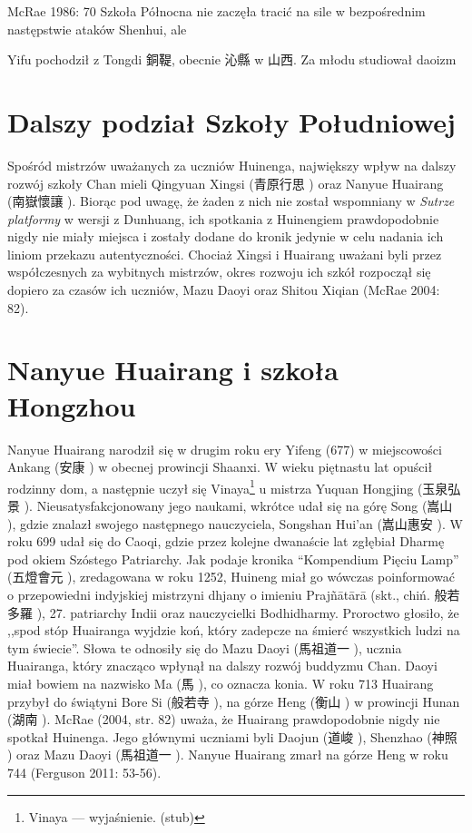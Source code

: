 McRae 1986: 70
Szkoła Północna nie zaczęła tracić na sile w bezpośrednim następstwie ataków Shenhui, ale

Yifu pochodził z Tongdi 銅鞮, obecnie 沁縣 w 山西.
Za młodu studiował daoizm
\fi

\section{Dalszy podział Szkoły Południowej}
Spośród mistrzów uważanych za uczniów Huinenga, największy wpływ na dalszy rozwój szkoły Chan mieli Qingyuan Xingsi (青原行思 ) oraz Nanyue Huairang (南嶽懷讓 ).
Biorąc pod uwagę, że żaden z nich nie został wspomniany w \textit{Sutrze platformy} w wersji z Dunhuang, ich spotkania z Huinengiem prawdopodobnie nigdy nie miały miejsca i zostały dodane do kronik jedynie w celu nadania ich liniom przekazu autentyczności.
Chociaż Xingsi i Huairang uważani byli przez współczesnych za wybitnych mistrzów, okres rozwoju ich szkół rozpoczął się dopiero za czasów ich uczniów, Mazu Daoyi oraz Shitou Xiqian %
(McRae 2004: 82).

\section{Nanyue Huairang i szkoła Hongzhou}
Nanyue Huairang narodził się w drugim roku ery Yifeng (677) w miejscowości Ankang (安康 ) w obecnej prowincji Shaanxi.
W wieku piętnastu lat opuścił rodzinny dom, a następnie uczył się Vinaya\footnote{Vinaya --- wyjaśnienie. (stub)} u mistrza Yuquan Hongjing (玉泉弘景 ).
Nieusatysfakcjonowany jego naukami, wkrótce udał się na górę Song (嵩山 ), gdzie znalazł swojego następnego nauczyciela, Songshan Hui'an (嵩山惠安 ).
W roku 699 udał się do Caoqi, gdzie przez kolejne dwanaście lat zgłębiał Dharmę pod okiem Szóstego Patriarchy.
Jak podaje kronika ``Kompendium Pięciu Lamp'' (五燈會元 ), zredagowana w roku 1252, Huineng miał go wówczas poinformować o przepowiedni indyjskiej mistrzyni dhjany o imieniu Prajñātārā (skt., chiń. 般若多羅 ), 27. patriarchy Indii oraz nauczycielki Bodhidharmy.
Proroctwo głosiło, że ,,spod stóp Huairanga wyjdzie koń, który zadepcze na śmierć wszystkich ludzi na tym świecie''.
Słowa te odnosiły się do Mazu Daoyi (馬祖道一 ), ucznia Huairanga, który znacząco wpłynął na dalszy rozwój buddyzmu Chan.
Daoyi miał bowiem na nazwisko Ma (馬 ), co oznacza konia.
W roku 713 Huairang przybył do świątyni Bore Si (般若寺 ), na górze Heng (衡山 ) w prowincji Hunan (湖南 ).
McRae (2004, str. 82) uważa, że Huairang prawdopodobnie nigdy nie spotkał Huinenga.
Jego głównymi uczniami byli Daojun (道峻 ), Shenzhao (神照 ) oraz Mazu Daoyi (馬祖道一 ).
Nanyue Huairang zmarł na górze Heng w roku 744
(Ferguson 2011: 53-56).

